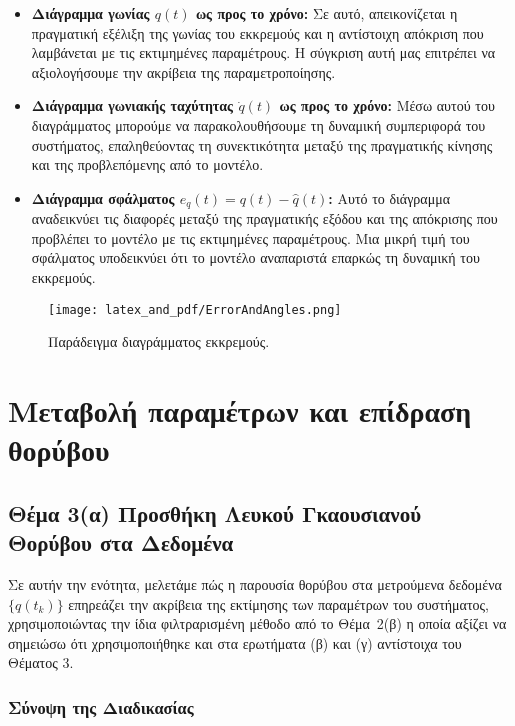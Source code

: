 \documentclass[a4paper,12pt]{report}
\newcommand{\gr}{\selectlanguage{greek}}
\begin{document}
\begin{itemize}
    \item \textbf{Διάγραμμα γωνίας \(q(t)\) ως προς το χρόνο:} Σε αυτό, απεικονίζεται η πραγματική εξέλιξη της γωνίας του εκκρεμούς και η αντίστοιχη απόκριση που λαμβάνεται με τις εκτιμημένες παραμέτρους. Η σύγκριση αυτή μας επιτρέπει να αξιολογήσουμε την ακρίβεια της παραμετροποίησης.
    
    \item \textbf{Διάγραμμα γωνιακής ταχύτητας \(\dot{q}(t)\) ως προς το χρόνο:} Μέσω αυτού του διαγράμματος μπορούμε να παρακολουθήσουμε τη δυναμική συμπεριφορά του συστήματος, επαληθεύοντας τη συνεκτικότητα μεταξύ της πραγματικής κίνησης και της προβλεπόμενης από το μοντέλο.
    
    \item \textbf{Διάγραμμα σφάλματος \(e_q(t)=q(t)-\hat{q}(t)\):} Αυτό το διάγραμμα αναδεικνύει τις διαφορές μεταξύ της πραγματικής εξόδου και της απόκρισης που προβλέπει το μοντέλο με τις εκτιμημένες παραμέτρους. Μια μικρή τιμή του σφάλματος υποδεικνύει ότι το μοντέλο αναπαριστά επαρκώς τη δυναμική του εκκρεμούς.
\end{itemize}

\begin{figure}[H]
   \centering
   \texttt{[image: latex\_and\_pdf/ErrorAndAngles.png]}
   \caption{Παράδειγμα διαγράμματος εκκρεμούς.}
   \label{fig:myimage}
\end{figure}

\chapter{\gr Μεταβολή παραμέτρων και επίδραση θορύβου}
\section{Θέμα 3(α) Προσθήκη Λευκού Γκαουσιανού Θορύβου στα Δεδομένα}

Σε αυτήν την ενότητα, μελετάμε πώς η παρουσία θορύβου στα μετρούμενα δεδομένα $\{q(t_k)\}$ 
επηρεάζει την ακρίβεια της εκτίμησης των παραμέτρων του συστήματος, 
χρησιμοποιώντας την ίδια φιλτραρισμένη μέθοδο από το Θέμα~2(β) η οποία αξίζει να σημειώσω ότι χρησιμοποιήθηκε και στα ερωτήματα (β) και (γ) αντίστοιχα του Θέματος 3.

\subsection*{Σύνοψη της Διαδικασίας}
\end{document}
